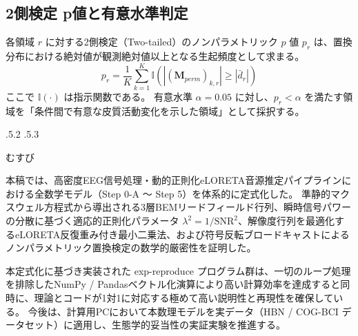 \documentclass[platex,dvipdfmx,12pt]{jsarticle}
\makeatletter
\renewcommand{\section}{%
  \clearpage
  \@startsection{section}{1}{\z@}%
  {\Cvs \@plus.5\Cdp \@minus.2\Cdp}%
  {.5\Cvs \@plus.3\Cdp}%
  {\normalfont\LARGE\headfont\raggedright}%
}
\makeatother
\begin{document}
\subsection{2側検定 p値と有意水準判定}
各領域 $r$ に対する2側検定（Two-tailed）のノンパラメトリック $p$ 値 $p_r$ は、置換分布における絶対値が観測絶対値以上となる生起頻度として求まる。
\begin{equation}
  p_r = \frac{1}{K} \sum_{k=1}^K \mathbb{I}\left( |(\mathbf{M}_{perm})_{k, r}| \ge |\bar{d}_r| \right)
  \label{eq:p_value_vectorized}
\end{equation}
ここで $\mathbb{I}(\cdot)$ は指示関数である。
有意水準 $\alpha = 0.05$ に対し、$p_r < \alpha$ を満たす領域を「条件間で有意な皮質活動変化を示した領域」として採択する。

\section{むすび}

本稿では、高密度EEG信号処理・動的正則化eLORETA音源推定パイプラインにおける全数学モデル（Step 0-A 〜 Step 5）を体系的に定式化した。
準静的マクスウェル方程式から導出される3層BEMリードフィールド行列、瞬時信号パワーの分散に基づく適応的正則化パラメータ $\lambda^2 = 1/\text{SNR}^2$、解像度行列を最適化するeLORETA反復重み付き最小二乗法、および符号反転ブロードキャストによるノンパラメトリック置換検定の数学的厳密性を証明した。

本定式化に基づき実装された exp-reproduce プログラム群は、一切のループ処理を排除したNumPy / Pandasベクトル化演算により高い計算効率を達成すると同時に、理論とコードが1対1に対応する極めて高い説明性と再現性を確保している。
今後は、計算用PCにおいて本数理モデルを実データ（HBN / COG-BCI データセット）に適用し、生態学的妥当性の実証実験を推進する。

\clearpage


\end{document}
